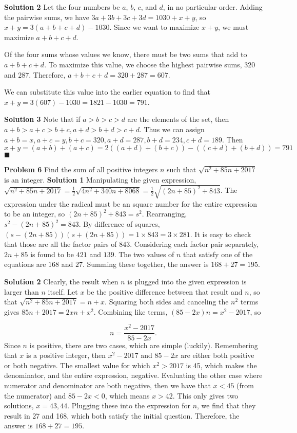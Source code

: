 \documentclass[a4paper,11pt]{article}
\begin{document}
\textbf{Solution 2}
Let the four numbers be $a$, $b$, $c$, and $d$, in no particular order. Adding the pairwise sums, we have $3a+3b+3c+3d=1030+x+y$, so $x+y=3(a+b+c+d)-1030$. Since we want to maximize $x+y$, we must maximize $a+b+c+d$.

Of the four sums whose values we know, there must be two sums that add to $a+b+c+d$. To maximize this value, we choose the highest pairwise sums, $320$ and $287$. Therefore, $a+b+c+d=320+287=607$.

We can substitute this value into the earlier equation to find that $x+y=3(607)-1030=1821-1030=\boxed{791}$.

\textbf{Solution 3}
Note that if $a>b>c>d$ are the elements of the set, then $a+b>a+c>b+c,a+d>b+d>c+d$. Thus we can assign $a+b=x,a+c=y,b+c=320,a+d=287,b+d=234,c+d=189$. Then $x+y=(a+b)+(a+c)=2((a+d)+(b+c))-((c+d)+(b+d))=791$ \hfill $\blacksquare$

\textbf{Problem 6}
Find the sum of all positive integers $n$ such that $\sqrt{n^2+85n+2017}$ is an integer.
\textbf{
Solution 1}
Manipulating the given expression, $\sqrt{n^2+85n+2017}=\frac{1}{2}\sqrt{4n^2+340n+8068}=\frac{1}{2}\sqrt{(2n+85)^2+843}$. The expression under the radical must be an square number for the entire expression to be an integer, so $(2n+85)^2+843=s^2$. Rearranging, $s^2-(2n+85)^2=843$. By difference of squares, $(s-(2n+85))(s+(2n+85))=1\times843=3\times281$. It is easy to check that those are all the factor pairs of 843. Considering each factor pair separately, $2n+85$ is found to be $421$ and $139$. The two values of $n$ that satisfy one of the equations are $168$ and $27$. Summing these together, the answer is $168+27=\boxed{195}$.

\textbf{Solution 2}
Clearly, the result when $n$ is plugged into the given expression is larger than $n$ itself. Let $x$ be the positive difference between that result and $n$, so that $\sqrt{n^2+85n+2017}=n+x$. Squaring both sides and canceling the $n^2$ terms gives $85n+2017=2xn+x^2$. Combining like terms, $(85-2x)n=x^2-2017$, so

\[n=\frac{x^2-2017}{85-2x}.\]
Since $n$ is positive, there are two cases, which are simple (luckily). Remembering that $x$ is a positive integer, then $x^2-2017$ and $85-2x$ are either both positive or both negative. The smallest value for which $x^2>2017$ is 45, which makes the denominator, and the entire expression, negative. Evaluating the other case where numerator and denominator are both negative, then we have that $x<45$ (from the numerator) and  $85-2x<0$, which means $x>42$. This only gives two solutions, $x=43, 44$. Plugging these into the expression for $n$, we find that they result in 27 and 168, which both satisfy the initial question. Therefore, the answer is $168+27=\boxed{195}$.
\end{document}
